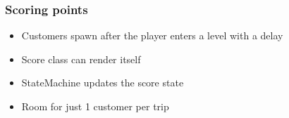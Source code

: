 \begin{frame}
    \frametitle{Scoring points}
    \begin{itemize}
        \item Customers spawn after the player enters a level with a delay
        \item Score class can render itself
        \item StateMachine updates the score state
        \item Room for just 1 customer per trip
    \end{itemize}
\end{frame}
